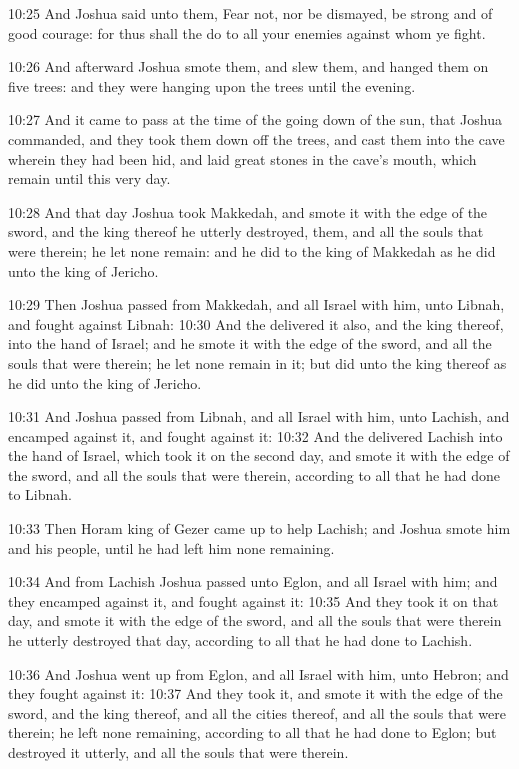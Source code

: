 10:25 And Joshua said unto them, Fear not, nor be dismayed, be strong
and of good courage: for thus shall the \LORD do to all your enemies
against whom ye fight.

10:26 And afterward Joshua smote them, and slew them, and hanged them
on five trees: and they were hanging upon the trees until the evening.

10:27 And it came to pass at the time of the going down of the sun,
that Joshua commanded, and they took them down off the trees, and cast
them into the cave wherein they had been hid, and laid great stones in
the cave's mouth, which remain until this very day.

10:28 And that day Joshua took Makkedah, and smote it with the edge of
the sword, and the king thereof he utterly destroyed, them, and all
the souls that were therein; he let none remain: and he did to the
king of Makkedah as he did unto the king of Jericho.

10:29 Then Joshua passed from Makkedah, and all Israel with him, unto
Libnah, and fought against Libnah: 10:30 And the \LORD delivered it
also, and the king thereof, into the hand of Israel; and he smote it
with the edge of the sword, and all the souls that were therein; he
let none remain in it; but did unto the king thereof as he did unto
the king of Jericho.

10:31 And Joshua passed from Libnah, and all Israel with him, unto
Lachish, and encamped against it, and fought against it: 10:32 And the
\LORD delivered Lachish into the hand of Israel, which took it on the
second day, and smote it with the edge of the sword, and all the souls
that were therein, according to all that he had done to Libnah.

10:33 Then Horam king of Gezer came up to help Lachish; and Joshua
smote him and his people, until he had left him none remaining.

10:34 And from Lachish Joshua passed unto Eglon, and all Israel with
him; and they encamped against it, and fought against it: 10:35 And
they took it on that day, and smote it with the edge of the sword, and
all the souls that were therein he utterly destroyed that day,
according to all that he had done to Lachish.

10:36 And Joshua went up from Eglon, and all Israel with him, unto
Hebron; and they fought against it: 10:37 And they took it, and smote
it with the edge of the sword, and the king thereof, and all the
cities thereof, and all the souls that were therein; he left none
remaining, according to all that he had done to Eglon; but destroyed
it utterly, and all the souls that were therein.

